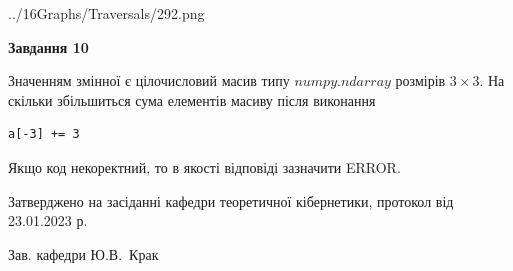 \documentclass[12pt, ukrainian]{article}
\begin{document}
{\begin {large}
\begin{center}
	{../16Graphs/Traversals/292.png}
\end{center}\par
\newpage

{\begin {center}\textbf{Завдання 10}\end {center}}\par
Значенням змінної  є цілочисловий масив типу $numpy.ndarray$ розмірів $3{\times}3$. На скільки збільшиться сума елементів масиву  після виконання
\begin{verbatim}
a[-3] += 3
\end{verbatim}


Якщо код некоректний, то в якості відповіді зазначити ERROR.\par
\newpage


\end {large}
}
{\smallskip \begin {small} Затверджено на засіданні кафедри теоретичної кібернетики, протокол  від   23.01.2023 р.\par\smallskip\smallskip
{\parbox {6.5 cm}{Зав. кафедри \dotfill Ю.В.~Крак}} \end{small}}
\end{document}
